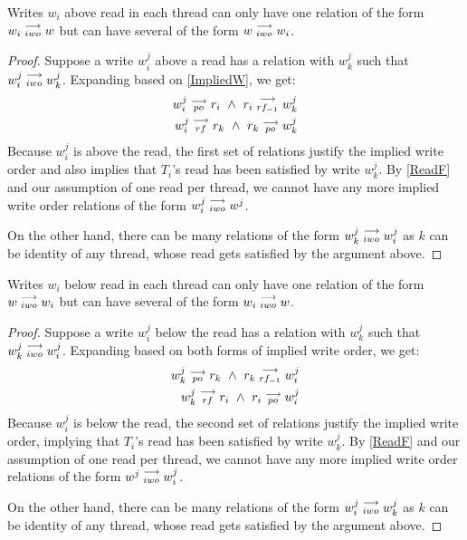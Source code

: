 
    \begin{property}
        \label{prop7}
        Writes $w_i$ above read in each thread can only have one relation of the form $w_i\stackrel{\longrightarrow}{_{iwo}}w$ but can have several of the form $w\stackrel{\longrightarrow}{_{iwo}}w_i$. 
    \end{property}

    \begin{proof}
        Suppose a write $w_i^j$ above a read has a relation with $w_k^j$ such that $w_i^j\stackrel{\longrightarrow}{_{iwo}}w_k^j$. Expanding based on \ref{ImpliedW}, we get:
        \begin{align}
            w_i^j\stackrel{\longrightarrow}{_{po}}r_i \ \wedge \ r_i\stackrel{\longrightarrow}{_{rf_{-1}}}w_k^j \\ 
            w_i^j\stackrel{\longrightarrow}{_{rf}}r_k \ \wedge \ r_k\stackrel{\longrightarrow}{_{po}}w_k^j
        \end{align}
        Because $w_i^j$ is above the read, the first set of relations justify the implied write order and also implies that $T_i$'s read has been satisfied by write $w_k^j$. By \ref{ReadF} and our assumption of one read per thread, we cannot have any more implied write order relations of the form $w_i^j\stackrel{\longrightarrow}{_{iwo}}w^j$. 

        On the other hand, there can be many relations of the form $w_k^j\stackrel{\longrightarrow}{_{iwo}}w_i^j$ as $k$ can be identity of any thread, whose read gets satisfied by the argument above.
    \end{proof}

   
    \begin{property}
        \label{prop8}
        Writes $w_i$ below read in each thread can only have one relation of the form $w\stackrel{\longrightarrow}{_{iwo}}w_i$ but can have several of the form $w_i\stackrel{\longrightarrow}{_{iwo}}w$. 
    \end{property}

    \begin{proof}
        Suppose a write $w_i^j$ below the read has a relation with $w_k^j$ such that $w_k^j\stackrel{\longrightarrow}{_{iwo}}w_i^j$. Expanding based on both forms of implied write order, we get:
        \begin{align}
            w_k^j\stackrel{\longrightarrow}{_{po}}r_k \ \wedge \ r_k\stackrel{\longrightarrow}{_{rf_{-1}}}w_i^j \\ 
            w_k^j\stackrel{\longrightarrow}{_{rf}}r_i \ \wedge \ r_i\stackrel{\longrightarrow}{_{po}}w_i^j
        \end{align}
        Because $w_i^j$ is below the read, the second set of relations justify the implied write order, implying that $T_i$'s read has been satisfied by write $w_k^j$. By \ref{ReadF} and our assumption of one read per thread, we cannot have any more implied write order relations of the form $w^j\stackrel{\longrightarrow}{_{iwo}}w_i^j$. 

        On the other hand, there can be many relations of the form $w_i^j\stackrel{\longrightarrow}{_{iwo}}w_k^j$ as $k$ can be identity of any thread, whose read gets satisfied by the argument above.  
    \end{proof}


